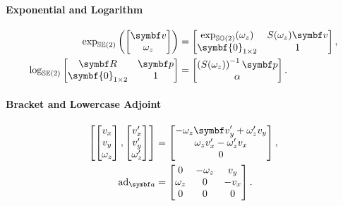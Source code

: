 \begin{properties}[breakable, title={$\SEtwo$ formula sheet}]
  \paragraph{Exponential and Logarithm}
  \begin{align}
    \exp_\SEtwo \left(\begin{bmatrix} \bv \\ \omega_{z} \end{bmatrix} \right) & =  \begin{bmatrix}
      \exp_{\SOtwo} (\omega_z) & S(\omega_z)\bv \\ \symbf{0}_{1 \times 2} & 1
    \end{bmatrix}, \\
    \log_\SEtwo \begin{bmatrix} \bR & \bp \\ \symbf{0}_{1 \times 2} & 1 \end{bmatrix}               & = \begin{bmatrix} \left( S(\omega_z) \right)^{-1} \bp \\ \alpha \end{bmatrix}.
  \end{align}

  \paragraph{Bracket and Lowercase Adjoint}
  \begin{equation}
    \begin{aligned}
      \left[
        \begin{bmatrix} v_{x} \\ v_{y} \\ \omega_{z} \end{bmatrix},     \begin{bmatrix} v_{x}' \\ v_{y}' \\ \omega_{z}' \end{bmatrix}
      \right] & = \begin{bmatrix} -\omega_{z} \bv_{y}' + \omega_{z}' v_{y} \\ \omega_{z} v_{x}' - \omega_{z}' v_{x} \\ 0 \end{bmatrix},  \\
      \ad_\a  & =  \begin{bmatrix}  0 & -\omega_z & v_y \\ \omega_z & 0 & -v_x \\ 0 & 0 & 0 \end{bmatrix}.
    \end{aligned}
  \end{equation}


\end{properties}
